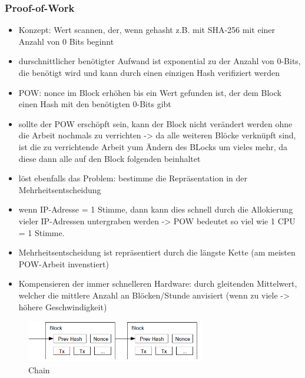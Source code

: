 \subsubsection*{Proof-of-Work}
    \begin{itemize}
        \item Konzept: Wert scannen, der, wenn gehasht z.B. mit SHA-256 mit einer Anzahl von 0 Bits beginnt
        \item durschnittlicher benötigter Aufwand ist exponential zu der Anzahl von 0-Bits, die benötigt wird und kann durch einen einzigen Hash verifiziert werden
        \item POW: nonce im Block erhöhen bis ein Wert gefunden ist, der dem Block einen Hash mit den benötigten 0-Bits gibt
        \item sollte der POW erschöpft sein, kann der Block nicht verändert werden ohne die Arbeit nochmals zu verrichten -> da alle weiteren Blöcke verknüpft sind, ist die zu verrichtende Arbeit yum Ändern des BLocks um vieles mehr, da diese dann alle auf den Block folgenden beinhaltet
        \item löst ebenfalls das Problem: bestimme die Repräsentation in der Mehrheitsentscheidung
        \item wenn IP-Adresse = 1 Stimme, dann kann dies schnell durch die Allokierung vieler IP-Adressen untergraben werden -> POW bedeutet so viel wie 1 CPU = 1 Stimme. 
        \item Mehrheitsentscheidung ist repräsentiert durch die längste Kette (am meisten POW-Arbeit invenstiert)
        \item Kompensieren der immer schnelleren Hardware: durch gleitenden Mittelwert, welcher die mittlere Anzahl an Blöcken/Stunde anvisiert (wenn zu viele ->  höhere Geschwindigkeit)
    \end{itemize}
    \begin{figure}[H]
        \centering
        \includegraphics[width=0.7\textwidth]{paperNotes/bitcoin03.PNG}
        \caption{Chain}
        \label{figure:chain}
    \end{figure}

